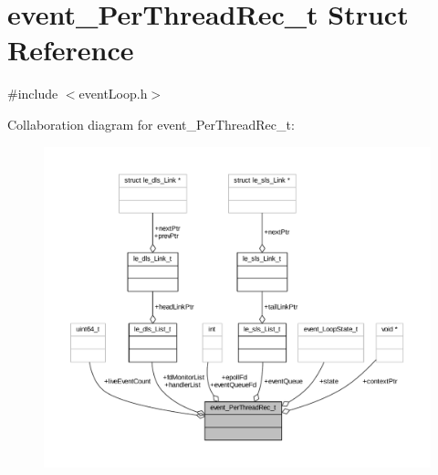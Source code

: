 \hypertarget{structevent___per_thread_rec__t}{}\section{event\+\_\+\+Per\+Thread\+Rec\+\_\+t Struct Reference}
\label{structevent___per_thread_rec__t}


{\ttfamily \#include $<$event\+Loop.\+h$>$}



Collaboration diagram for event\+\_\+\+Per\+Thread\+Rec\+\_\+t\+:
\nopagebreak
\begin{figure}[H]
\begin{center}
\leavevmode
\includegraphics[width=350pt]{structevent___per_thread_rec__t__coll__graph}
\end{center}
\end{figure}
